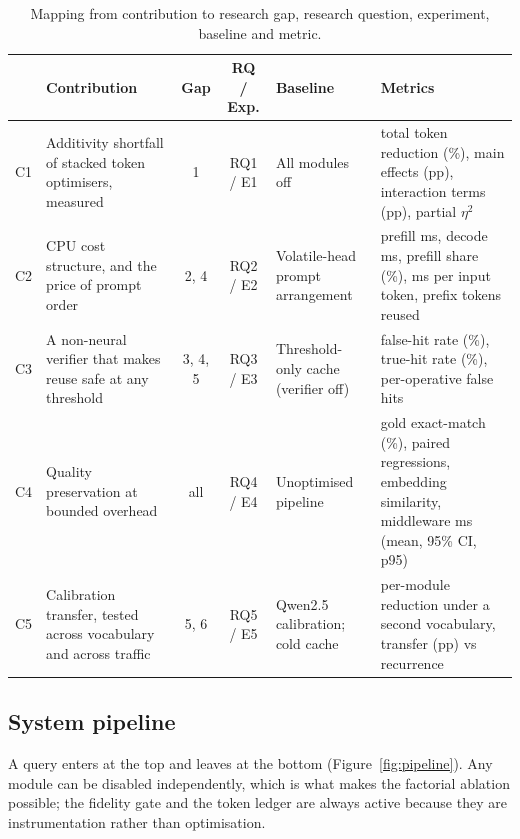 \documentclass[11pt,a4paper]{article}
\begin{document}
\begin{table}[htbp]
\centering
\caption{Mapping from contribution to research gap, research question,
experiment, baseline and metric.}
\label{tab:map}
\scriptsize
\begin{tabularx}{\textwidth}{@{}l L{2.5cm} c c L{2.2cm} X@{}}
\toprule
& \textbf{Contribution} & \textbf{Gap} & \textbf{RQ / Exp.} & \textbf{Baseline} & \textbf{Metrics} \\
\midrule
C1 & Additivity shortfall of stacked token optimisers, measured &
     1 & RQ1 / E1 & All modules off &
     total token reduction (\%), main effects (pp), interaction terms (pp), partial $\eta^2$ \\
\addlinespace
C2 & CPU cost structure, and the price of prompt order &
     2, 4 & RQ2 / E2 & Volatile-head prompt arrangement &
     prefill ms, decode ms, prefill share (\%), ms per input token, prefix tokens reused \\
\addlinespace
C3 & A non-neural verifier that makes reuse safe at any threshold &
     3, 4, 5 & RQ3 / E3 & Threshold-only cache (verifier off) &
     false-hit rate (\%), true-hit rate (\%), per-operative false hits \\
\addlinespace
C4 & Quality preservation at bounded overhead &
     all & RQ4 / E4 & Unoptimised pipeline &
     gold exact-match (\%), paired regressions, embedding similarity, middleware ms (mean, 95\% CI, p95) \\
\addlinespace
C5 & Calibration transfer, tested across vocabulary and across traffic &
     5, 6 & RQ5 / E5 & Qwen2.5 calibration; cold cache &
     per-module reduction under a second vocabulary, transfer (pp) vs recurrence \\
\bottomrule
\end{tabularx}
\end{table}

\subsection{System pipeline}
\label{sec:pipeline}

A query enters at the top and leaves at the bottom
(Figure~\ref{fig:pipeline}). Any module can be disabled independently, which is
what makes the factorial ablation possible; the fidelity gate and the token
ledger are always active because they are instrumentation rather than
optimisation.
\end{document}
